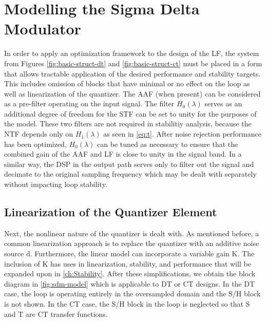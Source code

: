 
\chapter{Modelling the Sigma Delta Modulator}
\label{ch:Modelling}

In order to apply an optimization framework to the design of the \gls{LF}, the system from Figures \ref{fig:basic-struct-dt} and \ref{fig:basic-struct-ct} must be placed in a form that allows tractable application of the desired performance and stability targets. This includes omission of blocks that have minimal or no effect on the loop as well as linearization of the quantizer. The \gls{AAF} (when present) can be considered as a pre-filter operating on the input signal. The filter $H_0(\lambda)$ serves as an additional degree of freedom for the \gls{STF} can be set to unity for the purposes of the model. These two filters are not required in stabilitiy analysis, because the \gls{NTF} depends only on $H_1(\lambda)$ as seen in \autoref{eq:t}. After noise rejection performance has been optimized, $H_0(\lambda)$ can be tuned as necessary to ensure that the combined gain of the \gls{AAF} and \gls{LF} is close to unity in the signal band. In a similar way, the \gls{DSP} in the output path serves only to filter out the signal and decimate to the original sampling frequency which may be dealt with separately without impacting loop stability.

\section{Linearization of the Quantizer Element}

Next, the nonlinear nature of the quantizer is dealt with. As mentioned before, a common linearization approach is to replace the quantizer with an additive noise source \gls{d}. Furthermore, the linear model can incorporate a variable gain \gls{K}. The inclusion of \gls{K} has uses in linearization, stability, and performance that will be expanded upon in \autoref{ch:Stability}. After these simplifications, we obtain the block diagram in \autoref{fig:sdm-model} which is applicable to \gls{DT} or \gls{CT} designs. In the \gls{DT} case, the loop is operating entirely in the oversampled domain and the \gls{S/H} block is not shown. In the \gls{CT} case, the \gls{S/H} block in the loop is neglected so that \gls{S} and \gls{T} are \gls{CT} transfer functions.

